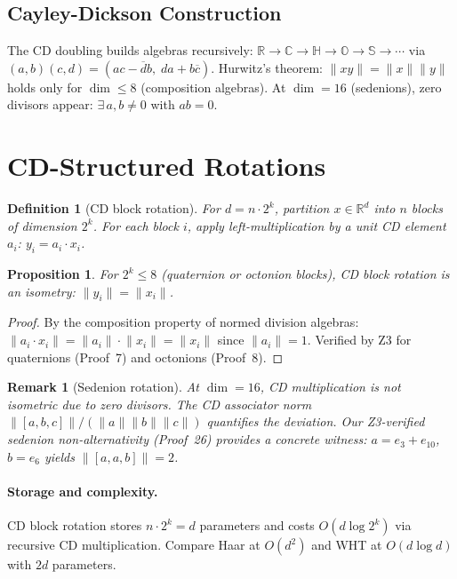 \documentclass[letterpaper,11pt]{article}
\newtheorem{proposition}[theorem]{Proposition}
\newtheorem{definition}[theorem]{Definition}
\newtheorem{remark}[theorem]{Remark}
\newcommand{\R}{\mathbb{R}}
\newcommand{\C}{\mathbb{C}}
\newcommand{\HH}{\mathbb{H}}
\newcommand{\OO}{\mathbb{O}}
\newcommand{\norm}[1]{\lVert #1 \rVert}
\newcommand{\conj}[1]{\overline{#1}}
\begin{document}
\subsection{Cayley-Dickson Construction}

The CD doubling builds algebras recursively:
$\R \to \C \to \HH \to \OO \to \mathbb{S} \to \cdots$
via $(a,b)(c,d) = (ac - \conj{d}b,\; da + b\conj{c})$.
Hurwitz's theorem: $\norm{xy} = \norm{x}\norm{y}$ holds only for
$\dim \leq 8$ (composition algebras). At $\dim = 16$ (sedenions),
zero divisors appear: $\exists\, a,b \neq 0$ with $ab = 0$.

\section{CD-Structured Rotations}
\label{sec:cd-rotation}

\begin{definition}[CD block rotation]
For $d = n \cdot 2^k$, partition $x \in \R^d$ into $n$ blocks of
dimension $2^k$. For each block $i$, apply left-multiplication by
a unit CD element $a_i$: $y_i = a_i \cdot x_i$.
\end{definition}

\begin{proposition}
For $2^k \leq 8$ (quaternion or octonion blocks), CD block rotation
is an isometry: $\norm{y_i} = \norm{x_i}$.
\end{proposition}
\begin{proof}
By the composition property of normed division algebras:
$\norm{a_i \cdot x_i} = \norm{a_i} \cdot \norm{x_i} = \norm{x_i}$
since $\norm{a_i} = 1$. Verified by Z3 for quaternions (Proof~7)
and octonions (Proof~8).
\end{proof}

\begin{remark}[Sedenion rotation]
At $\dim = 16$, CD multiplication is \emph{not} isometric due to
zero divisors. The CD associator norm
$\norm{[a,b,c]} / (\norm{a}\norm{b}\norm{c})$
quantifies the deviation. Our Z3-verified sedenion non-alternativity
(Proof~26) provides a concrete witness: $a = e_3 + e_{10}$, $b = e_6$
yields $\norm{[a,a,b]} = 2$.
\end{remark}

\paragraph{Storage and complexity.}
CD block rotation stores $n \cdot 2^k = d$ parameters and costs
$O(d \log 2^k)$ via recursive CD multiplication. Compare Haar at
$O(d^2)$ and WHT at $O(d \log d)$ with $2d$ parameters.
\end{document}
